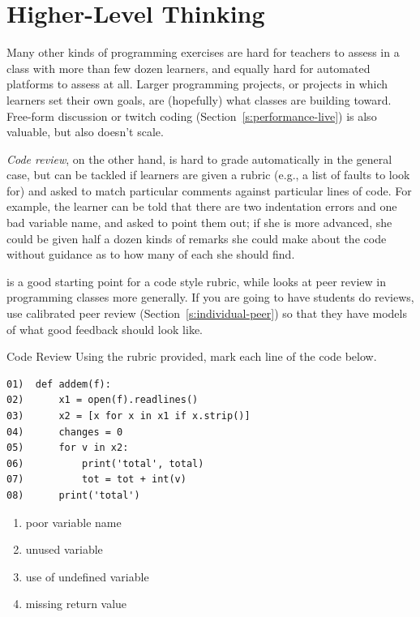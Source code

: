 \section{Higher-Level Thinking}\label{s:exercises-higher}

Many other kinds of programming exercises are hard for teachers to
assess in a class with more than few dozen learners, and equally hard
for automated platforms to assess at all. Larger programming projects,
or projects in which learners set their own goals, are (hopefully) what
classes are building toward. Free-form discussion or twitch coding
(Section~\ref{s:performance-live}) is also valuable, but also doesn't
scale.

\emph{Code review}, on the other hand, is hard to grade automatically in the
general case, but can be tackled if learners are given a rubric (e.g., a
list of faults to look for) and asked to match particular comments
against particular lines of code. For example, the learner can be told
that there are two indentation errors and one bad variable name, and
asked to point them out; if she is more advanced, she could be given
half a dozen kinds of remarks she could make about the code without
guidance as to how many of each she should find.

\cite{Steg2016b} is a good starting point for a code style rubric,
while \cite{Luxt2009} looks at peer review in programming classes
more generally. If you are going to have students do reviews, use
calibrated peer review (Section~\ref{s:individual-peer}) so that they
have models of what good feedback should look like.

\begin{aside}{Code Review}
  Using the rubric provided, mark each line of the code below.

\begin{verbatim}
01)  def addem(f):
02)      x1 = open(f).readlines()
03)      x2 = [x for x in x1 if x.strip()]
04)      changes = 0
05)      for v in x2:
06)          print('total', total)
07)          tot = tot + int(v)
08)      print('total')
\end{verbatim}

  \begin{enumerate}
  \item
    poor variable name
  \item
    unused variable
  \item
    use of undefined variable
  \item
    missing return value
  \end{enumerate}
\end{aside}

